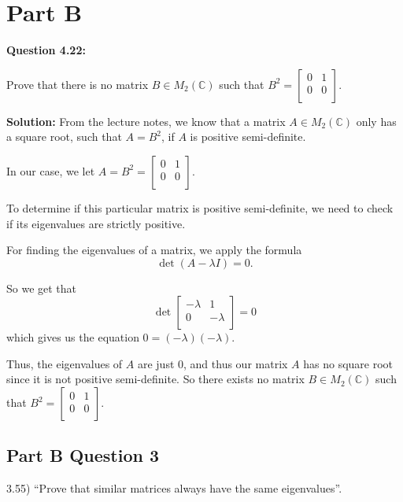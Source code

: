 \documentclass{article}
\begin{document}
\break
\section{Part B}

\begin{flushleft}
\textbf{Question 4.22:} 

Prove that there is no matrix \(B \in M_2(\mathbb{C})\) 
such that \(B^2 = 
\begin{bmatrix}
    0 & 1 \\
    0 & 0 \\
\end{bmatrix}\).

\textbf{Solution:} 
From the lecture notes, we know that a matrix \(A \in M_2(\mathbb{C})\) 
only has a square root, such that \(A = B^2\), if \(A\) is positive semi-definite.

In our case, we let \(A = B^2 = 
\begin{bmatrix}
    0 & 1 \\
    0 & 0 \\
\end{bmatrix}\).

To determine if this particular matrix is positive semi-definite, we need to check if its eigenvalues are strictly positive.

For finding the eigenvalues of a matrix, we apply the formula 
\[
\det(A - \lambda I) = 0.
\]

So we get that
\[
\det
\begin{bmatrix}
    -\lambda & 1 \\
    0 & -\lambda \\
\end{bmatrix}
= 0
\]
which gives us the equation \(0 = (-\lambda)(-\lambda)\).


Thus, the eigenvalues of \(A\) are just 0, and thus our matrix \(A\) has no square root since it is not positive semi-definite.
So there exists no matrix \(B \in M_2(\mathbb{C})\) 
such that \(B^2 = 
\begin{bmatrix}
    0 & 1 \\
    0 & 0 \\
\end{bmatrix}\).

\end{flushleft}

\subsection*{Part B Question 3}
3.55) “Prove that similar matrices always have the same eigenvalues”.
\end{document}
